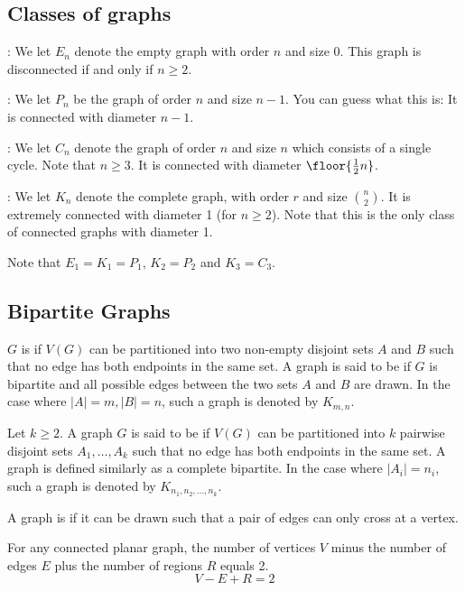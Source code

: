 \subsection{Classes of graphs}
: We let $E_n$ denote the empty graph with order $n$ and size 0. This graph is disconnected if and only if $n \ge 2$.

: We let $P_n$ be the graph of order $n$ and size $n-1$. You can guess what this is: It is connected with diameter $n-1$.

: We let $C_n$ denote the graph of order $n$ and size $n$ which consists of a single
cycle. Note that $n \ge 3$. It is connected with diameter $\floor{\frac{1}{2}n}$.

: We let $K_n$ denote the complete graph, with order $r$ and size $\binom{n}{2}$. It is extremely connected with diameter 1 (for $n \ge 2$). Note that this is the only class of connected graphs with diameter 1.

Note that $E_1 = K_1 = P_1$, $K_2 = P_2$ and $K_3 = C_3$.

\subsection{Bipartite Graphs}
$G$ is  if $V(G)$ can be partitioned into two non-empty disjoint sets $A$ and $B$ such that no edge has both endpoints in the same set. A graph is said to be  if $G$ is bipartite and all possible edges between the two sets $A$ and $B$ are drawn. In the case where $|A|=m, |B|=n$, such a graph is denoted by $K_{m,n}$.

Let $k \ge 2$. A graph $G$ is said to be  if $V(G)$ can be partitioned into $k$ pairwise disjoint sets $A_1, \dots, A_k$ such that no edge has both endpoints in the same set. A  graph is defined similarly as a complete bipartite. In the case where $|A_i| = n_i$, such a graph is denoted by $K_{n_1,n_2,\dots,n_k}$.

A graph is  if it can be drawn such that a pair of edges can only cross at a vertex.

\begin{theorem}
For any connected planar graph, the number of vertices $V$ minus the number of edges $E$ plus the number of regions $R$ equals 2. 
\begin{equation}
V-E+R=2
\end{equation}
\end{theorem}

